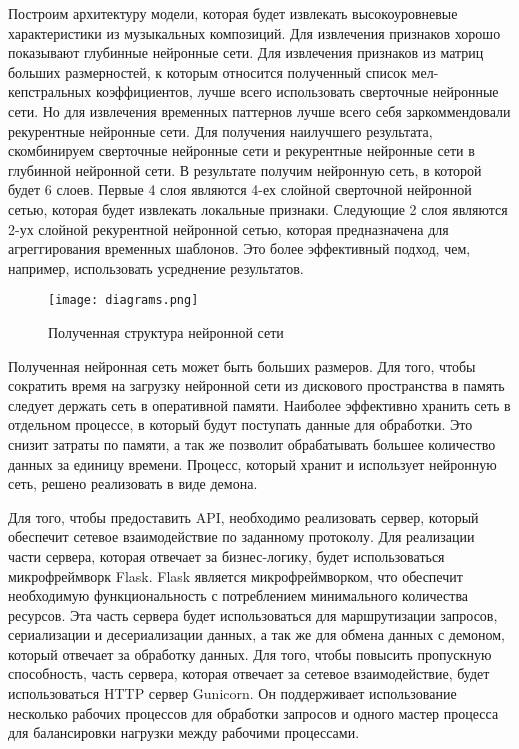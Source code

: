 Построим архитектуру модели, которая будет извлекать высокоуровневые характеристики из музыкальных композиций. Для извлечения признаков хорошо показывают глубинные нейронные сети. Для извлечения признаков из матриц больших размерностей, к которым относится полученный список мел-кепстральных коэффициентов, лучше всего использовать сверточные нейронные сети. Но для извлечения временных паттернов лучше всего себя заркоммендовали рекурентные нейронные сети. Для получения наилучшего результата, скомбинируем сверточные нейронные сети и рекурентные нейронные сети в глубинной нейронной сети. В результате получим нейронную сеть, в которой будет 6 слоев. Первые 4 слоя являются 4-ех слойной сверточной нейронной сетью, которая будет извлекать локальные признаки. Следующие 2 слоя являются 2-ух слойной рекурентной нейронной сетью, которая предназначена для агреггирования временных шаблонов. Это более эффективный подход, чем, например, использовать усреднение результатов.

\begin{figure}
\centering
	\texttt{[image: diagrams.png]}
	\caption{Полученная структура нейронной сети}
	\label{sec:design:dev:windows_mel}
\end{figure}

Полученная нейронная сеть может быть больших размеров. Для того, чтобы сократить время на загрузку нейронной сети из дискового пространства в память следует держать сеть в оперативной памяти. Наиболее эффективно хранить сеть в отдельном процессе, в который будут поступать данные для обработки. Это снизит затраты по памяти, а так же позволит обрабатывать большее количество данных за единицу времени. Процесс, который хранит и использует нейронную сеть, решено реализовать в виде демона.

Для того, чтобы предоставить API, необходимо реализовать сервер, который обеспечит сетевое взаимодействие по заданному протоколу. Для реализации части сервера, которая отвечает за бизнес-логику, будет использоваться микрофреймворк Flask. Flask является микрофреймворком, что обеспечит необходимую функциональность с потреблением минимального количества ресурсов. Эта часть сервера будет использоваться для маршрутизации запросов, сериализации и десериализации данных, а так же для обмена данных с демоном, который отвечает за обработку данных. Для того, чтобы повысить пропускную способность, часть сервера, которая отвечает за сетевое взаимодействие, будет использоваться HTTP сервер Gunicorn. Он поддерживает использование несколько рабочих процессов для обработки запросов и одного мастер процесса для балансировки нагрузки между рабочими процессами.


